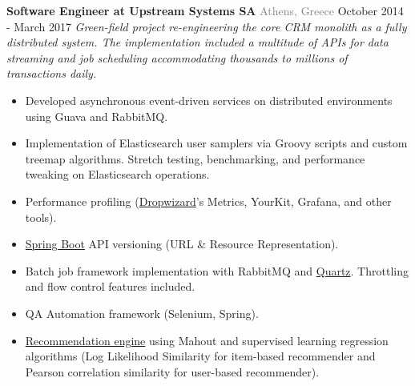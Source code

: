 \documentclass{article}
\begin{document}
        \begin{flushleft}
            \textbf{\large Software Engineer at Upstream Systems SA} {\footnotesize \textcolor{gray}{Athens, Greece}} \hfill \small October 2014 - March 2017   \newline 
          \textit{Green-field project re-engineering the core CRM monolith as a fully distributed system. The implementation included a multitude of APIs for data streaming and job scheduling accommodating thousands to millions of transactions daily.} 
            
            \begin{itemize}[label=\raisebox{0.25ex}{\tiny$\bullet$}, leftmargin=1.5em, labelsep=0.3em]
                \item Developed asynchronous event-driven services on distributed environments using Guava and RabbitMQ.
            \item Implementation of Elasticsearch user samplers via Groovy scripts and custom treemap algorithms. Stretch testing, benchmarking, and performance tweaking on Elasticsearch operations.
            \item Performance profiling (\href{https://metrics.dropwizard.io/4.2.0/}{Dropwizard}’s Metrics, YourKit, Grafana, and other tools).
            \item \href{https://spring.io/projects/spring-boot}{Spring Boot} API versioning (URL \& Resource Representation).
            \item Batch job framework implementation with RabbitMQ and \href{https://github.com/quartz-scheduler/quartz}{Quartz}. Throttling and flow control features included.
                \item QA Automation framework (Selenium, Spring).
            \item \href{https://github.com/tonyflow/recommender}{Recommendation engine} using Mahout and supervised learning regression algorithms (Log Likelihood Similarity for item-based recommender and Pearson correlation similarity for user-based recommender).
            \end{itemize}
                         \\ [1ex]
        \end{flushleft}
\end{document}
